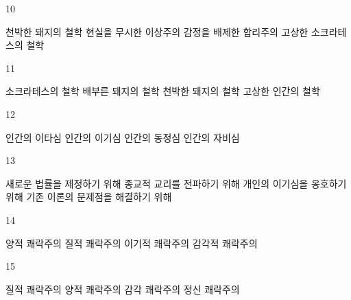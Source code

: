 \documentclass[fs9,seriesRus]{korfarm-base}
\begin{document}
\begin{kfSentenceUnit}{10}{}
\begin{kfChoices}
\kfChoice 천박한 돼지의 철학
\kfChoice 현실을 무시한 이상주의
\kfChoice 감정을 배제한 합리주의
\kfChoice 고상한 소크라테스의 철학
\end{kfChoices}
\end{kfSentenceUnit}

\begin{kfSentenceUnit}{11}{}
\begin{kfChoices}
\kfChoice 소크라테스의 철학
\kfChoice 배부른 돼지의 철학
\kfChoice 천박한 돼지의 철학
\kfChoice 고상한 인간의 철학
\end{kfChoices}
\end{kfSentenceUnit}

\begin{kfSentenceUnit}{12}{}
\begin{kfChoices}
\kfChoice 인간의 이타심
\kfChoice 인간의 이기심
\kfChoice 인간의 동정심
\kfChoice 인간의 자비심
\end{kfChoices}
\end{kfSentenceUnit}

\begin{kfSentenceUnit}{13}{}
\begin{kfChoices}
\kfChoice 새로운 법률을 제정하기 위해
\kfChoice 종교적 교리를 전파하기 위해
\kfChoice 개인의 이기심을 옹호하기 위해
\kfChoice 기존 이론의 문제점을 해결하기 위해
\end{kfChoices}
\end{kfSentenceUnit}

\begin{kfSentenceUnit}{14}{}
\begin{kfChoices}
\kfChoice 양적 쾌락주의
\kfChoice 질적 쾌락주의
\kfChoice 이기적 쾌락주의
\kfChoice 감각적 쾌락주의
\end{kfChoices}
\end{kfSentenceUnit}

\begin{kfSentenceUnit}{15}{}
\begin{kfChoices}
\kfChoice 질적 쾌락주의
\kfChoice 양적 쾌락주의
\kfChoice 감각 쾌락주의
\kfChoice 정신 쾌락주의
\end{kfChoices}
\end{kfSentenceUnit}
\end{document}
